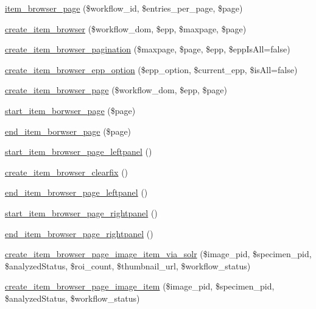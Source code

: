 \begin{DoxyCompactItemize}
\item 
\hyperlink{workspace_8functions_8php_ad6f4b98127b10422b842a1c921ec5e23}{item\_\-browser\_\-page} (\$workflow\_\-id, \$entries\_\-per\_\-page, \$page)
\item 
\hyperlink{workspace_8functions_8php_af670bf78ce8af176b5de1710630a5566}{create\_\-item\_\-browser} (\$workflow\_\-dom, \$epp, \$maxpage, \$page)
\item 
\hyperlink{workspace_8functions_8php_aa0e5888c6f195e90dc99b2d94d6a5fd4}{create\_\-item\_\-browser\_\-pagination} (\$maxpage, \$page, \$epp, \$eppIsAll=false)
\item 
\hyperlink{workspace_8functions_8php_ac16a70ff976e88b8a1c6d765606bde1a}{create\_\-item\_\-browser\_\-epp\_\-option} (\$epp\_\-option, \$current\_\-epp, \$isAll=false)
\item 
\hyperlink{workspace_8functions_8php_a2a83a520847eb4ca467cfc78b462ed5a}{create\_\-item\_\-browser\_\-page} (\$workflow\_\-dom, \$epp, \$page)
\item 
\hyperlink{workspace_8functions_8php_afe5f63794b763b609679ddb4eb7016c2}{start\_\-item\_\-borwser\_\-page} (\$page)
\item 
\hyperlink{workspace_8functions_8php_a02118ba92691034863d360d75a8322f9}{end\_\-item\_\-borwser\_\-page} (\$page)
\item 
\hyperlink{workspace_8functions_8php_ac8190dcd062e7bdbe5026c21bbf07cac}{start\_\-item\_\-browser\_\-page\_\-leftpanel} ()
\item 
\hyperlink{workspace_8functions_8php_a5abdc0ec35a882364969312123d974c4}{create\_\-item\_\-browser\_\-clearfix} ()
\item 
\hyperlink{workspace_8functions_8php_a1eaf28245e9f14205d262f64e45f439c}{end\_\-item\_\-browser\_\-page\_\-leftpanel} ()
\item 
\hyperlink{workspace_8functions_8php_a7044e5b0e90c5de508336ab880c5c478}{start\_\-item\_\-browser\_\-page\_\-rightpanel} ()
\item 
\hyperlink{workspace_8functions_8php_acb615cddac4ba844bc7c8dbbba394b37}{end\_\-item\_\-browser\_\-page\_\-rightpanel} ()
\item 
\hyperlink{workspace_8functions_8php_a1dd11ac45a65b79f00a6e03a19c4d7ea}{create\_\-item\_\-browser\_\-page\_\-image\_\-item\_\-via\_\-solr} (\$image\_\-pid, \$specimen\_\-pid, \$analyzedStatus, \$roi\_\-count, \$thumbnail\_\-url, \$workflow\_\-status)
\item 
\hyperlink{workspace_8functions_8php_ab15550a7aa0b4e5495fd073d7c10cb4e}{create\_\-item\_\-browser\_\-page\_\-image\_\-item} (\$image\_\-pid, \$specimen\_\-pid, \$analyzedStatus, \$workflow\_\-status)

\end{DoxyCompactItemize}
